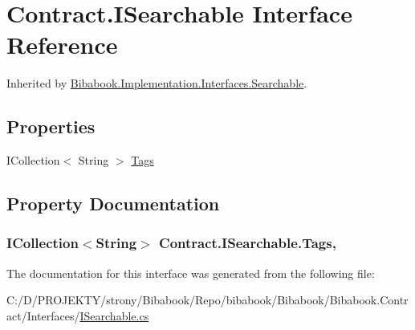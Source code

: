 \hypertarget{interface_contract_1_1_i_searchable}{}\section{Contract.\+I\+Searchable Interface Reference}
\label{interface_contract_1_1_i_searchable}


Inherited by \hyperlink{class_bibabook_1_1_implementation_1_1_interfaces_1_1_searchable}{Bibabook.\+Implementation.\+Interfaces.\+Searchable}.

\subsection*{Properties}
\begin{DoxyCompactItemize}
\item 
I\+Collection$<$ String $>$ \hyperlink{interface_contract_1_1_i_searchable_a8b89d4e1547fce0bc60092122ae3f6ec}{Tags}
\end{DoxyCompactItemize}


\subsection{Property Documentation}
\hypertarget{interface_contract_1_1_i_searchable_a8b89d4e1547fce0bc60092122ae3f6ec}{}
\subsubsection[{Tags}]{\setlength{\rightskip}{0pt plus 5cm}I\+Collection$<$String$>$ Contract.\+I\+Searchable.\+Tags\hspace{0.3cm}{\ttfamily [get]}, {\ttfamily [set]}}\label{interface_contract_1_1_i_searchable_a8b89d4e1547fce0bc60092122ae3f6ec}


The documentation for this interface was generated from the following file\+:\begin{DoxyCompactItemize}
\item 
C\+:/\+D/\+P\+R\+O\+J\+E\+K\+T\+Y/strony/\+Bibabook/\+Repo/bibabook/\+Bibabook/\+Bibabook.\+Contract/\+Interfaces/\hyperlink{_i_searchable_8cs}{I\+Searchable.\+cs}\end{DoxyCompactItemize}
